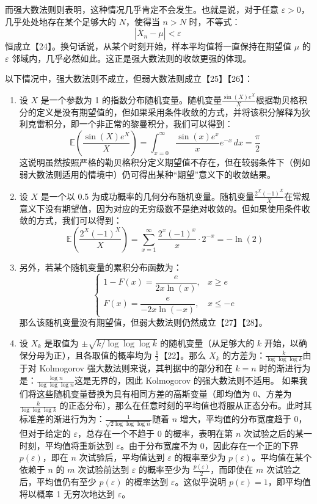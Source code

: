 而强大数法则则表明，这种情况几乎肯定不会发生。也就是说，对于任意 $\varepsilon > 0$，几乎处处地存在某个足够大的 $N$，使得当 $n > N$ 时，不等式：
$$
|\overline{X}_n - \mu| < \varepsilon~
$$
恒成立【24】。换句话说，从某个时刻开始，样本平均值将一直保持在期望值 $\mu$ 的 $\varepsilon$ 邻域内，几乎必然如此。这正是强大数法则的收敛更强的体现。

以下情况中，强大数法则不成立，但弱大数法则成立【25】【26】：
\begin{enumerate}
\item 设 $X$ 是一个参数为 1 的指数分布随机变量。随机变量$\frac{\sin(X)e^{X}}{X}$根据勒贝格积分的定义是没有期望值的，但如果采用条件收敛的方式，并将该积分解释为狄利克雷积分，即一个非正常的黎曼积分，我们可以得到：
$$
\mathbb{E}\left(\frac{\sin(X)e^{X}}{X}\right) = \int_{x=0}^{\infty} \frac{\sin(x)e^{x}}{x} e^{-x} \, dx = \frac{\pi}{2}~
$$
这说明虽然按照严格的勒贝格积分定义期望值不存在，但在较弱条件下（例如弱大数法则适用的情境中）仍可得出某种“期望”意义下的收敛结果。
\item 设 $X$ 是一个以 0.5 为成功概率的几何分布随机变量。随机变量$\frac{2^{X}(-1)^{X}}{X}$在常规意义下没有期望值，因为对应的无穷级数不是绝对收敛的。但如果使用条件收敛的方式，我们可以得到：
$$
\mathbb{E}\left(\frac{2^{X}(-1)^{X}}{X}\right) = \sum_{x=1}^{\infty} \frac{2^{x}(-1)^{x}}{x} \cdot 2^{-x} = -\ln(2)~
$$
\item 另外，若某个随机变量的累积分布函数为：
$$
\begin{cases}
1 - F(x) = \dfrac{e}{2x \ln(x)}, & x \geq e \\
F(x) = \dfrac{e}{-2x \ln(-x)}, & x \leq -e
\end{cases}~
$$
那么该随机变量没有期望值，但弱大数法则仍然成立【27】【28】。
\item 设 $X_k$ 是取值为 $\pm \sqrt{k/\log \log \log k}$ 的随机变量（从足够大的 $k$ 开始，以确保分母为正），且各取值的概率均为 $\frac{1}{2}$【22】。那么 $X_k$ 的方差为：$\frac{k}{\log \log \log k}$由于对 Kolmogorov 强大数法则来说，其判据中的部分和在 $k = n$ 时的渐进行为是：$\frac{\log n}{\log \log \log n}$这是无界的，因此 Kolmogorov 的强大数法则不适用。
如果我们将这些随机变量替换为具有相同方差的高斯变量（即均值为 0、方差为 $\frac{k}{\log \log \log k}$ 的正态分布），那么在任意时刻的平均值也将服从正态分布。此时其标准差的渐进行为为：$\frac{1}{\sqrt{2 \log \log \log n}}$随着 $n$ 增大，平均值的分布宽度趋于 0，但对于给定的 $\varepsilon$，总存在一个不趋于 0 的概率，表明在第 $n$ 次试验之后的某一时刻，平均值将重新达到 $\varepsilon$。由于分布宽度不为 0，因此存在一个正的下界 $p(\varepsilon)$，即在 $n$ 次试验后，平均值达到 $\varepsilon$ 的概率至少为 $p(\varepsilon)$。平均值在某个依赖于 $n$ 的 $m$ 次试验前达到 $\varepsilon$ 的概率至少为 $\frac{p(\varepsilon)}{2}$，而即使在 $m$ 次试验之后，平均值仍有至少 $p(\varepsilon)$ 的概率达到 $\varepsilon$。这似乎说明 $p(\varepsilon) = 1$，即平均值将以概率 1 无穷次地达到 $\varepsilon$。
\end{enumerate}
